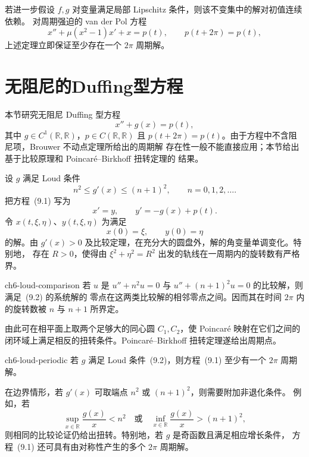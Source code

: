 若进一步假设 $f,g$ 对变量满足局部 Lipschitz 条件，则该不变集中的解对初值连续依赖。
对周期强迫的 van der Pol 方程
\[
  x''+\mu(x^2-1)x'+x=p(t),\qquad p(t+2\pi)=p(t),
\]
上述定理立即保证至少存在一个 $2\pi$ 周期解。

\section{无阻尼的Duffing型方程}

本节研究无阻尼 Duffing 型方程
\[
  x''+g(x)=p(t), \tag{9.1}
\]
其中 $g\in C^1(\mathbb R,\mathbb R)$，$p\in C(\mathbb R,\mathbb R)$ 且
$p(t+2\pi)=p(t)$。由于方程中不含阻尼项，Brouwer 不动点定理所给出的周期解
存在性一般不能直接应用；本节给出基于比较原理和 Poincar\'e--Birkhoff 扭转定理的
结果。

设 $g$ 满足 Loud 条件
\[
  n^2\leq g'(x)\leq(n+1)^2,\qquad n=0,1,2,\ldots . \tag{9.2}
\]
把方程~(9.1) 写为
\[
  x'=y,\qquad y'=-g(x)+p(t). \tag{9.3}
\]
令 $x(t,\xi,\eta)$、$y(t,\xi,\eta)$ 为满足
\[
  x(0)=\xi,\qquad y(0)=\eta \tag{9.4}
\]
的解。由 $g'(x)>0$ 及比较定理，在充分大的圆盘外，解的角变量单调变化。特别地，
存在 $R>0$，使得由 $\xi^2+\eta^2=R^2$ 出发的轨线在一周期内的旋转数有严格界。

\begin{lemma}{}{ch6-loud-comparison}
若 $u$ 是 $u''+n^2u=0$ 与 $u''+(n+1)^2u=0$ 的比较解，则满足~(9.2) 的系统解的
零点在这两类比较解的相邻零点之间。因而其在时间 $2\pi$ 内的旋转数被 $n$ 与 $n+1$
所界定。
\end{lemma}

由此可在相平面上取两个足够大的同心圆 $C_1,C_2$，使 Poincar\'e 映射在它们之间的
闭环域上满足相反的扭转条件。Poincar\'e--Birkhoff 扭转定理遂给出周期点。

\begin{theorem}{}{ch6-loud-periodic}
若 $g$ 满足 Loud 条件~(9.2)，则方程~(9.1) 至少有一个 $2\pi$ 周期解。
\end{theorem}

在边界情形，若 $g'(x)$ 可取端点 $n^2$ 或 $(n+1)^2$，则需要附加非退化条件。
例如，若
\[
  \sup_{x\in\mathbb R}\frac{g(x)}x<n^2\quad\text{或}\quad
  \inf_{x\in\mathbb R}\frac{g(x)}x>(n+1)^2,
\]
则相同的比较论证仍给出扭转。特别地，若 $g$ 是奇函数且满足相应增长条件，
方程~(9.1) 还可具有由对称性产生的多个 $2\pi$ 周期解。

